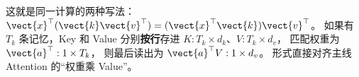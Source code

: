 \begin{idea}
这就是同一计算的两种写法：$\vect{x}^\top(\vect{k} \vect{v}^\top)=(\vect{x}^\top\vect{k})\vect{v}^\top$。
如果有 $T_k$ 条记忆，Key 和 Value 分别\textbf{按行}存进
$K:T_k\times d_k$、$V:T_k\times d_v$，
匹配权重为 $\vect{a}^\top:1\times T_k$，
则最后读出为 $\vect{a}^\top V:1\times d_v$。
形式直接对齐主线 Attention 的“权重乘 Value”。
\end{idea}
